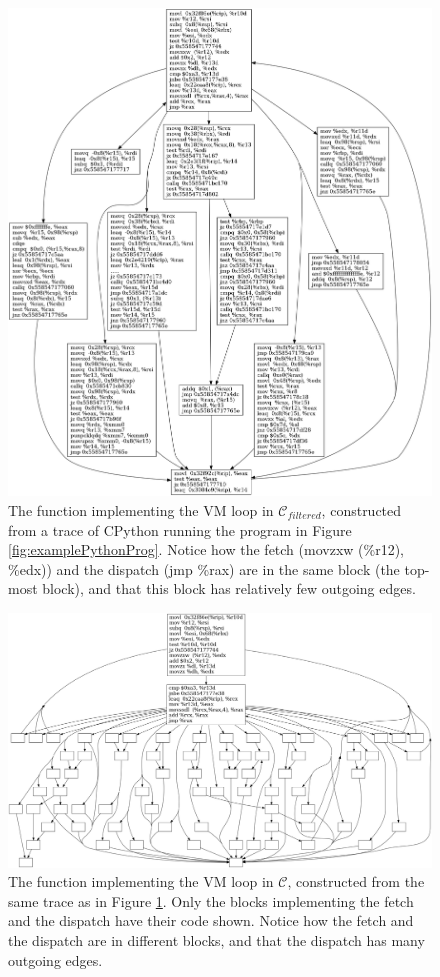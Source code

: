 \documentclass[english]{article}
\begin{document}
\begin{figure}[htp]
	\centering 	
	\includegraphics[width=\linewidth]{img/ConcreteVMFiltered.png}
	\caption{The function implementing the VM loop in $\mathcal{C}_{filtered}$, constructed from a trace of CPython running the program in Figure \ref{fig:examplePythonProg}. Notice how the fetch (movzxw (\%r12), \%edx)) and the dispatch (jmp \%rax) are in the same block (the top-most block), and that this block has relatively few outgoing edges.}
	\label{fig:concreteVMFiltered}
\end{figure}

\begin{figure}[htp]
	\centering 	
	\includegraphics[width=\linewidth]{img/ConcreteVMOriginal.png}
	\caption{The function implementing the VM loop in $\mathcal{C}$, constructed from the same trace as in Figure \ref{fig:concreteVMFiltered}. Only the blocks implementing the fetch and the dispatch have their code shown. Notice how the fetch and the dispatch are in different blocks, and that the dispatch has many outgoing edges.}
	\label{fig:concreteVMOriginal}
\end{figure}
\end{document}
